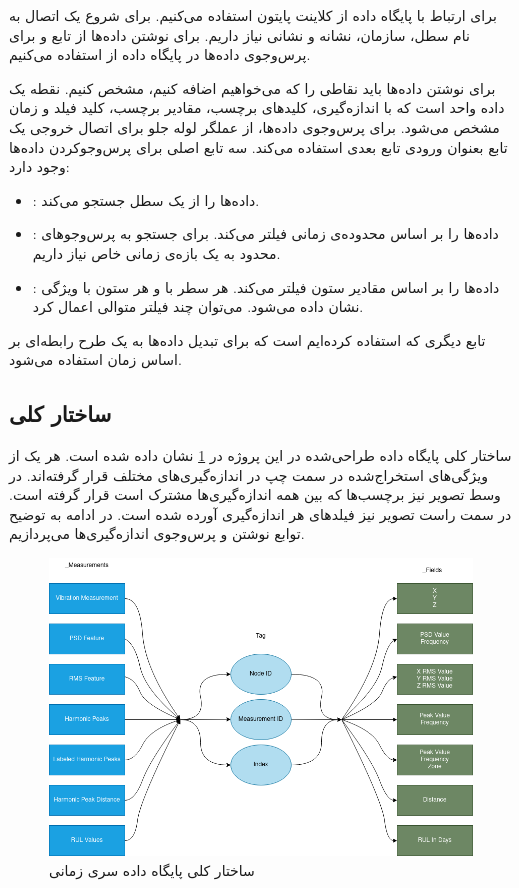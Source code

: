 برای ارتباط با پایگاه داده از کلاینت پایتون  استفاده می‌کنیم. برای شروع یک اتصال به نام سطل، سازمان، نشانه و نشانی نیاز داریم. برای نوشتن داده‌ها از تابع  و برای پرس‌وجوی داده‌ها در پایگاه داده از  استفاده می‌کنیم.


برای نوشتن داده‌ها باید نقاطی را که می‌خواهیم اضافه کنیم، مشخص کنیم. نقطه یک داده واحد است که با اندازه‌گیری، کلیدهای برچسب، مقادیر برچسب، کلید فیلد و زمان مشخص می‌شود. برای پرس‌وجوی داده‌ها، از عملگر لوله جلو برای اتصال خروجی یک تابع بعنوان ورودی تابع بعدی استفاده می‌کند\cite{influx_doc}. سه تابع اصلی برای پرس‌وجوکردن داده‌ها وجود دارد:

\begin{itemize}
\item {}: داده‌ها را از یک سطل جستجو می‌کند.
\item {}: داده‌ها را بر اساس محدوده‌ی زمانی فیلتر می‌کند. برای جستجو به پرس‌وجوهای محدود به یک بازه‌ی زمانی خاص نیاز داریم.
\item {}: داده‌ها را بر اساس مقادیر ستون فیلتر می‌کند. هر سطر با  و هر ستون با ویژگی  نشان داده می‌شود. می‌توان چند فیلتر متوالی اعمال کرد.
\end{itemize}

تابع دیگری که استفاده کرده‌ایم  است که برای تبدیل داده‌ها به یک طرح رابطه‌ای بر اساس زمان استفاده می‌شود.

\subsection{ساختار کلی}

ساختار کلی پایگاه داده طراحی‌شده در این پروژه در \cref{fig:influx_structure} نشان داده شده است. هر یک از ویژگی‌های استخراج‌شده در سمت چپ در اندازه‌گیری‌های مختلف قرار گرفته‌اند. در وسط تصویر نیز برچسب‌ها که بین همه اندازه‌گیری‌ها مشترک است قرار گرفته است. در سمت راست تصویر نیز فیلدهای هر اندازه‌گیری آورده شده است. در ادامه به توضیح توابع نوشتن و پرس‌وجوی اندازه‌گیری‌ها می‌پردازیم.


\begin{figure}[!h]
\centering\includegraphics[scale=.5]{influx_structure.png}
\caption{ساختار کلی پایگاه داده سری زمانی}\label{fig:influx_structure}
\end{figure}

